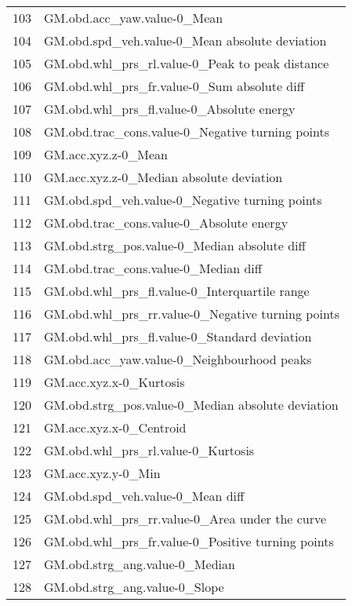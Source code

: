 \begin{tabular}{ll}
103 &                        GM.obd.acc\_yaw.value-0\_Mean \\
104 &     GM.obd.spd\_veh.value-0\_Mean absolute deviation \\
105 &    GM.obd.whl\_prs\_rl.value-0\_Peak to peak distance \\
106 &        GM.obd.whl\_prs\_fr.value-0\_Sum absolute diff \\
107 &          GM.obd.whl\_prs\_fl.value-0\_Absolute energy \\
108 &   GM.obd.trac\_cons.value-0\_Negative turning points \\
109 &                                GM.acc.xyz.z-0\_Mean \\
110 &           GM.acc.xyz.z-0\_Median absolute deviation \\
111 &     GM.obd.spd\_veh.value-0\_Negative turning points \\
112 &           GM.obd.trac\_cons.value-0\_Absolute energy \\
113 &       GM.obd.strg\_pos.value-0\_Median absolute diff \\
114 &               GM.obd.trac\_cons.value-0\_Median diff \\
115 &      GM.obd.whl\_prs\_fl.value-0\_Interquartile range \\
116 &  GM.obd.whl\_prs\_rr.value-0\_Negative turning points \\
117 &       GM.obd.whl\_prs\_fl.value-0\_Standard deviation \\
118 &         GM.obd.acc\_yaw.value-0\_Neighbourhood peaks \\
119 &                            GM.acc.xyz.x-0\_Kurtosis \\
120 &  GM.obd.strg\_pos.value-0\_Median absolute deviation \\
121 &                            GM.acc.xyz.x-0\_Centroid \\
122 &                 GM.obd.whl\_prs\_rl.value-0\_Kurtosis \\
123 &                                 GM.acc.xyz.y-0\_Min \\
124 &                   GM.obd.spd\_veh.value-0\_Mean diff \\
125 &     GM.obd.whl\_prs\_rr.value-0\_Area under the curve \\
126 &  GM.obd.whl\_prs\_fr.value-0\_Positive turning points \\
127 &                     GM.obd.strg\_ang.value-0\_Median \\
128 &                      GM.obd.strg\_ang.value-0\_Slope \\

\end{tabular}
